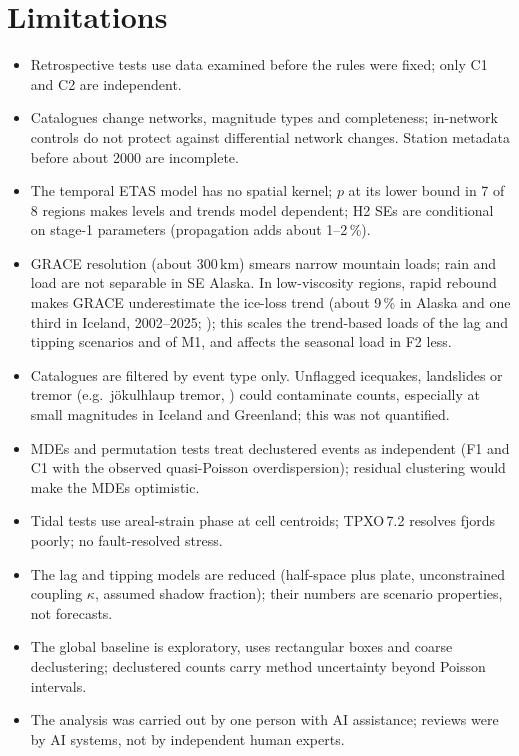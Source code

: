 \documentclass[11pt,a4paper]{article}
\begin{document}
\section{Limitations}
\label{sec:limitations}
\begin{itemize}
  \item Retrospective tests use data examined before the rules were fixed; only C1 and C2 are independent.
  \item Catalogues change networks, magnitude types and completeness; in-network controls do not protect against differential network changes. Station metadata before about 2000 are incomplete.
  \item The temporal ETAS model has no spatial kernel; $p$ at its lower bound in 7 of 8 regions makes levels and trends model dependent; H2 SEs are conditional on stage-1 parameters (propagation adds about 1--2\,\%).
  \item GRACE resolution (about 300\,km) smears narrow mountain loads; rain and load are not separable in SE Alaska. In low-viscosity regions, rapid rebound makes GRACE underestimate the ice-loss trend (about 9\,\% in Alaska and one third in Iceland, 2002--2025; \cite{sasgen2026}); this scales the trend-based loads of the lag and tipping scenarios and of M1, and affects the seasonal load in F2 less.
  \item Catalogues are filtered by event type only. Unflagged icequakes, landslides or tremor (e.g.\ jökulhlaup tremor, \cite{eibl2020}) could contaminate counts, especially at small magnitudes in Iceland and Greenland; this was not quantified.
  \item MDEs and permutation tests treat declustered events as independent (F1 and C1 with the observed quasi-Poisson overdispersion); residual clustering would make the MDEs optimistic.
  \item Tidal tests use areal-strain phase at cell centroids; TPXO\,7.2 resolves fjords poorly; no fault-resolved stress.
  \item The lag and tipping models are reduced (half-space plus plate, unconstrained coupling $\kappa$, assumed shadow fraction); their numbers are scenario properties, not forecasts.
  \item The global baseline is exploratory, uses rectangular boxes and coarse declustering; declustered counts carry method uncertainty beyond Poisson intervals.
  \item The analysis was carried out by one person with AI assistance; reviews were by AI systems, not by independent human experts.
\end{itemize}
\end{document}
